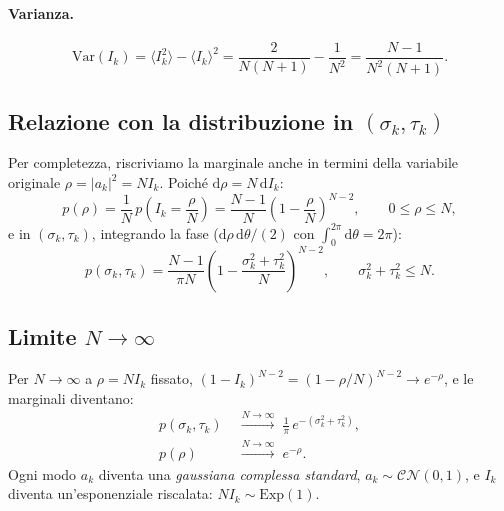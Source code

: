 \documentclass[a4paper,11pt]{article}
\newcommand{\de}{\mathrm{d}}
\begin{document}
\paragraph{Varianza.}
\begin{equation}
  \boxed{
  \mathrm{Var}(I_k)
  = \langle I_k^2 \rangle - \langle I_k \rangle^2
  = \frac{2}{N(N+1)} - \frac{1}{N^2}
  = \frac{N-1}{N^2(N+1)} .
  }
\end{equation}

\subsection{Relazione con la distribuzione in $(\sigma_k, \tau_k)$}

Per completezza, riscriviamo la marginale anche in termini della
variabile originale $\rho = |a_k|^2 = N I_k$.
Poiché $\de\rho = N\,\de I_k$:
\begin{equation}
  p(\rho) = \frac{1}{N}\,p\!\left(I_k = \frac{\rho}{N}\right)
  = \frac{N-1}{N}\left(1 - \frac{\rho}{N}\right)^{\!N-2} ,
  \qquad 0 \leq \rho \leq N ,
\end{equation}
e in $(\sigma_k, \tau_k)$, integrando la fase
($\de\rho\,\de\theta/(2)$ con $\int_0^{2\pi}\de\theta = 2\pi$):
\begin{equation}
  p(\sigma_k, \tau_k)
  = \frac{N-1}{\pi N}\left(1 - \frac{\sigma_k^2+\tau_k^2}{N}\right)^{\!N-2} ,
  \qquad \sigma_k^2+\tau_k^2 \leq N .
\end{equation}

\subsection{Limite $N \to \infty$}

Per $N \to \infty$ a $\rho = N I_k$ fissato, $(1 - I_k)^{N-2}
= (1 - \rho/N)^{N-2} \to e^{-\rho}$, e le marginali diventano:
\begin{align}
  p(\sigma_k, \tau_k) &\;\xrightarrow{N\to\infty}\;
  \frac{1}{\pi}\,e^{-(\sigma_k^2 + \tau_k^2)} , \\[6pt]
  p(\rho) &\;\xrightarrow{N\to\infty}\; e^{-\rho} .
\end{align}
Ogni modo $a_k$ diventa una \emph{gaussiana complessa standard},
$a_k \sim \mathcal{CN}(0,1)$, e $I_k$ diventa un'esponenziale
riscalata: $N I_k \sim \mathrm{Exp}(1)$.
\end{document}
